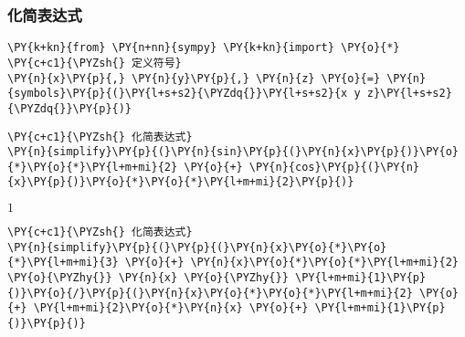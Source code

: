     \hypertarget{ux5316ux7b80ux8868ux8fbeux5f0f}{%
\subsubsection{化简表达式}\label{ux5316ux7b80ux8868ux8fbeux5f0f}}

    \begin{tcolorbox}[breakable, size=fbox, boxrule=1pt, pad at break*=1mm,colback=cellbackground, colframe=cellborder]
\begin{Verbatim}[commandchars=\\\{\}]
\PY{k+kn}{from} \PY{n+nn}{sympy} \PY{k+kn}{import} \PY{o}{*}
\PY{c+c1}{\PYZsh{} 定义符号}
\PY{n}{x}\PY{p}{,} \PY{n}{y}\PY{p}{,} \PY{n}{z} \PY{o}{=} \PY{n}{symbols}\PY{p}{(}\PY{l+s+s2}{\PYZdq{}}\PY{l+s+s2}{x y z}\PY{l+s+s2}{\PYZdq{}}\PY{p}{)}
\end{Verbatim}
\end{tcolorbox}

    \begin{tcolorbox}[breakable, size=fbox, boxrule=1pt, pad at break*=1mm,colback=cellbackground, colframe=cellborder]
\begin{Verbatim}[commandchars=\\\{\}]
\PY{c+c1}{\PYZsh{} 化简表达式}
\PY{n}{simplify}\PY{p}{(}\PY{n}{sin}\PY{p}{(}\PY{n}{x}\PY{p}{)}\PY{o}{*}\PY{o}{*}\PY{l+m+mi}{2} \PY{o}{+} \PY{n}{cos}\PY{p}{(}\PY{n}{x}\PY{p}{)}\PY{o}{*}\PY{o}{*}\PY{l+m+mi}{2}\PY{p}{)}
\end{Verbatim}
\end{tcolorbox}
 
            
    
    $\displaystyle 1$

    

    \begin{tcolorbox}[breakable, size=fbox, boxrule=1pt, pad at break*=1mm,colback=cellbackground, colframe=cellborder]
\begin{Verbatim}[commandchars=\\\{\}]
\PY{c+c1}{\PYZsh{} 化简表达式}
\PY{n}{simplify}\PY{p}{(}\PY{p}{(}\PY{n}{x}\PY{o}{*}\PY{o}{*}\PY{l+m+mi}{3} \PY{o}{+} \PY{n}{x}\PY{o}{*}\PY{o}{*}\PY{l+m+mi}{2} \PY{o}{\PYZhy{}} \PY{n}{x} \PY{o}{\PYZhy{}} \PY{l+m+mi}{1}\PY{p}{)}\PY{o}{/}\PY{p}{(}\PY{n}{x}\PY{o}{*}\PY{o}{*}\PY{l+m+mi}{2} \PY{o}{+} \PY{l+m+mi}{2}\PY{o}{*}\PY{n}{x} \PY{o}{+} \PY{l+m+mi}{1}\PY{p}{)}\PY{p}{)}
\end{Verbatim}
\end{tcolorbox}
 
